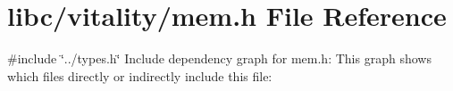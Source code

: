 \hypertarget{a00146}{}\section{libc/vitality/mem.h File Reference}
\label{a00146}
{\ttfamily \#include \char`\"{}../types.\+h\char`\"{}}\newline
Include dependency graph for mem.\+h\+:
This graph shows which files directly or indirectly include this file\+:
